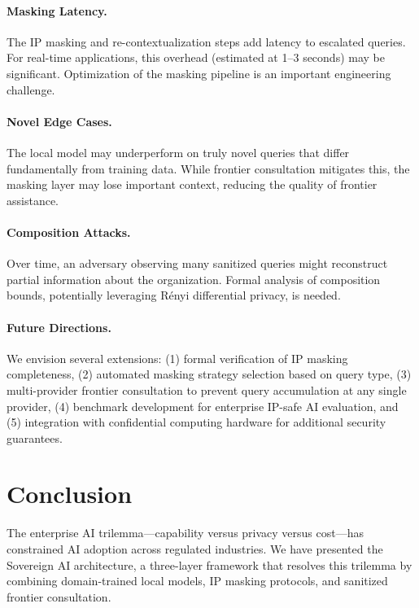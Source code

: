 \documentclass[11pt,a4paper]{article}
\begin{document}
\paragraph{Masking Latency.} The IP masking and re-contextualization steps add latency to escalated queries. For real-time applications, this overhead (estimated at 1--3 seconds) may be significant. Optimization of the masking pipeline is an important engineering challenge.

\paragraph{Novel Edge Cases.} The local model may underperform on truly novel queries that differ fundamentally from training data. While frontier consultation mitigates this, the masking layer may lose important context, reducing the quality of frontier assistance.

\paragraph{Composition Attacks.} Over time, an adversary observing many sanitized queries might reconstruct partial information about the organization. Formal analysis of composition bounds, potentially leveraging R\'enyi differential privacy, is needed.

\paragraph{Future Directions.} We envision several extensions: (1) formal verification of IP masking completeness, (2) automated masking strategy selection based on query type, (3) multi-provider frontier consultation to prevent query accumulation at any single provider, (4) benchmark development for enterprise IP-safe AI evaluation, and (5) integration with confidential computing hardware for additional security guarantees.

\section{Conclusion}
\label{sec:conclusion}

The enterprise AI trilemma---capability versus privacy versus cost---has constrained AI adoption across regulated industries. We have presented the Sovereign AI architecture, a three-layer framework that resolves this trilemma by combining domain-trained local models, IP masking protocols, and sanitized frontier consultation.
\end{document}
